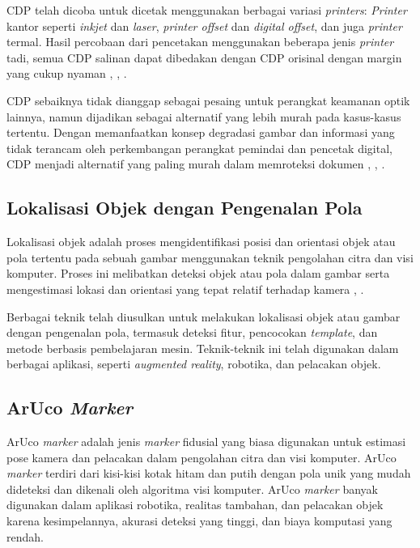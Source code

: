 CDP telah dicoba untuk dicetak menggunakan berbagai variasi \emph{printers}: \emph{Printer} kantor seperti \emph{inkjet} dan \emph{laser}, \emph{printer
	offset} dan \emph{digital offset}, dan juga \emph{printer} termal. Hasil percobaan dari pencetakan menggunakan beberapa jenis \emph{printer} tadi, semua CDP
salinan dapat dibedakan dengan CDP orisinal dengan margin yang cukup nyaman \cite{picard2004digital}, \cite{picard2004towards}, \cite{harwood1998optical}.

CDP sebaiknya tidak dianggap sebagai pesaing untuk perangkat keamanan optik lainnya, namun dijadikan sebagai alternatif yang lebih murah pada kasus-kasus
tertentu. Dengan memanfaatkan konsep degradasi gambar dan informasi yang tidak terancam oleh perkembangan perangkat pemindai dan pencetak digital, CDP menjadi
alternatif yang paling murah dalam memroteksi dokumen \cite{picard2004digital}, \cite{picard2004towards}, \cite{harwood1998optical}.

\subsection{Lokalisasi Objek dengan Pengenalan Pola}
Lokalisasi objek adalah proses mengidentifikasi posisi dan orientasi objek atau pola tertentu pada sebuah gambar menggunakan teknik pengolahan citra dan visi
komputer. Proses ini melibatkan deteksi objek atau pola dalam gambar serta mengestimasi lokasi dan orientasi yang tepat relatif terhadap kamera
\cite{sivic2003video}, \cite{liu2016ssd}.

Berbagai teknik telah diusulkan untuk melakukan lokalisasi objek atau gambar dengan pengenalan pola, termasuk deteksi fitur, pencocokan \emph{template}, dan
metode berbasis pembelajaran mesin. Teknik-teknik ini telah digunakan dalam berbagai aplikasi, seperti \emph{augmented reality}, robotika, dan pelacakan objek.

\subsection{ArUco \emph{Marker}}
ArUco \emph{marker} adalah jenis \emph{marker} fidusial yang biasa digunakan untuk estimasi pose kamera dan pelacakan dalam pengolahan citra dan visi komputer. ArUco \emph{marker} terdiri dari kisi-kisi kotak hitam dan putih dengan pola unik yang mudah dideteksi dan dikenali oleh algoritma visi komputer. ArUco \emph{marker} banyak digunakan dalam aplikasi robotika, realitas tambahan, dan pelacakan objek karena kesimpelannya, akurasi deteksi yang tinggi, dan biaya komputasi yang rendah.

